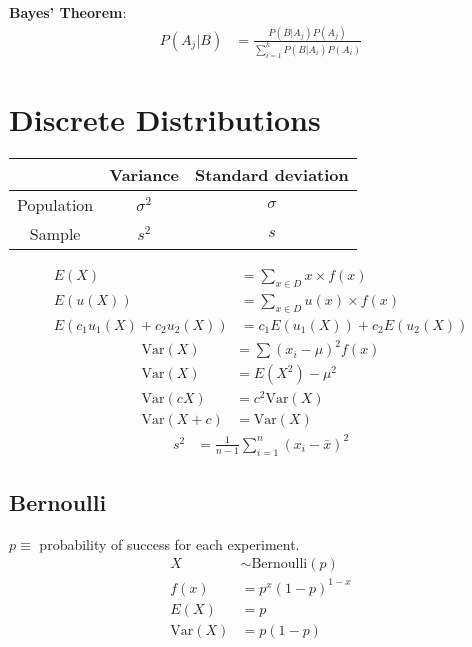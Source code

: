 \documentclass{article}
\newcommand{\var}{\text{Var}}
\newcommand{\bernoulli}{\text{Bernoulli}}
\begin{document}
\begin{multicols*}{2}
\textbf{Bayes' Theorem}:
\begin{align*}
    P(A_j|B) &= \frac{P(B|A_j) P(A_j)}{\sum_{i = 1}^k P(B|A_i) P(A_i)}
\end{align*}

\section{Discrete Distributions}

\begin{center}
    \begin{tabular}{|c|c|c|}
        \hline
        & Variance & Standard deviation \\ \hline
        Population & $\sigma^2$ & $\sigma$ \\ \hline
        Sample & $s^2$ & $s$ \\ \hline
    \end{tabular}
\end{center}
\begin{align*}
    E(X) &= \sum_{x \in D} x \times f(x) \\
    E(u(X)) &= \sum_{x \in D} u(x) \times f(x) \\
    E(c_1 u_1(X) + c_2 u_2(X)) &= c_1 E(u_1(X)) + c_2 E(u_2(X))
\end{align*}
\begin{align*}
    \var(X) &= \sum (x_i - \mu)^2 f(x) \\
    \var(X) &= E(X^2) - \mu^2 \\
    \var(cX) &= c^2 \var(X) \\
    \var(X + c) &= \var(X)
\end{align*}
\begin{align*}
    s^2 &= \frac{1}{n - 1} \sum_{i = 1}^n (x_i - \bar{x})^2
\end{align*}

\subsection{Bernoulli}

$p \equiv$ probability of success for each experiment.
\begin{align*}
    X &\sim \bernoulli(p) \\
    f(x) &= p^x (1-p)^{1-x} \\
    E(X) &= p \\
    \var(X) &= p(1-p)
\end{align*}


\end{multicols*}
\end{document}

